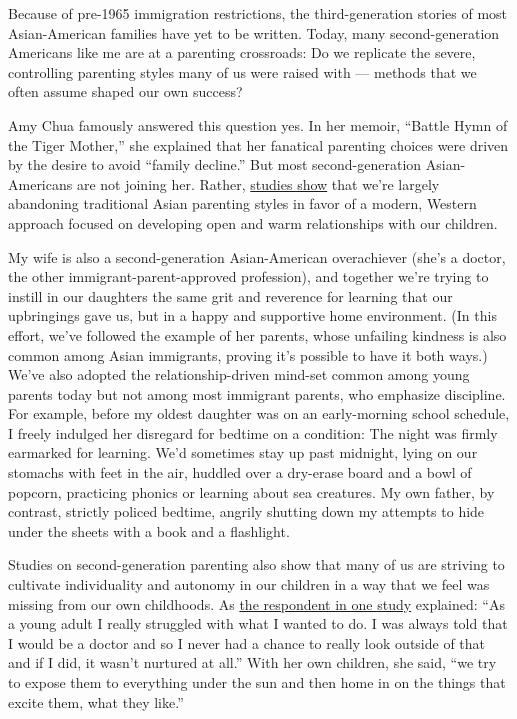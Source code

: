 Because of pre-1965 immigration restrictions, the third-generation
stories of most Asian-American families have yet to be written. Today,
many second-generation Americans like me are at a parenting crossroads:
Do we replicate the severe, controlling parenting styles many of us were
raised with --- methods that we often assume shaped our own success?

Amy Chua famously answered this question yes. In her memoir, ``Battle
Hymn of the Tiger Mother,'' she explained that her fanatical parenting
choices were driven by the desire to avoid ``family decline.'' But most
second-generation Asian-Americans are not joining her. Rather,
\href{https://onlinelibrary.wiley.com/doi/full/10.1111/famp.12052}{studies
show} that we're largely abandoning traditional Asian parenting styles
in favor of a modern, Western approach focused on developing open and
warm relationships with our children.

My wife is also a second-generation Asian-American overachiever (she's a
doctor, the other immigrant-parent-approved profession), and together
we're trying to instill in our daughters the same grit and reverence for
learning that our upbringings gave us, but in a happy and supportive
home environment. (In this effort, we've followed the example of her
parents, whose unfailing kindness is also common among Asian immigrants,
proving it's possible to have it both ways.) We've also adopted the
relationship-driven mind-set common among young parents today but not
among most immigrant parents, who emphasize discipline. For example,
before my oldest daughter was on an early-morning school schedule, I
freely indulged her disregard for bedtime on a condition: The night was
firmly earmarked for learning. We'd sometimes stay up past midnight,
lying on our stomachs with feet in the air, huddled over a dry-erase
board and a bowl of popcorn, practicing phonics or learning about sea
creatures. My own father, by contrast, strictly policed bedtime, angrily
shutting down my attempts to hide under the sheets with a book and a
flashlight.

Studies on second-generation parenting also show that many of us are
striving to cultivate individuality and autonomy in our children in a
way that we feel was missing from our own childhoods. As
\href{https://onlinelibrary.wiley.com/doi/pdf/10.1111/famp.12052}{the
respondent in one study} explained: ``As a young adult I really
struggled with what I wanted to do. I was always told that I would be a
doctor and so I never had a chance to really look outside of that and if
I did, it wasn't nurtured at all.'' With her own children, she said,
``we try to expose them to everything under the sun and then home in on
the things that excite them, what they like.''

